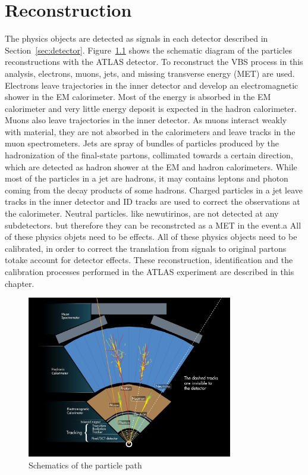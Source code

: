 \chapter{Reconstruction}
\label{chap:reconstruction}
The physics objects are detected as signals in each detector described in Section~\ref{sec:detector}.
Figure~\ref{fig:ParticlePath} shows the schematic diagram of the particles reconstructions with the ATLAS detector. 
To reconstruct the VBS process in this analysis, electrons, muons, jets, and missing transverse energy (MET) are used.
Electrons leave trajectories in the inner detector and develop an electromagnetic shower in the EM calorimeter. 
Most of the energy is absorbed in the EM calorimeter and very little energy deposit is expected in the hadron calorimeter.
Muons also leave trajectories in the inner detector.
As muons interact weakly with material, they are not absorbed in the calorimeters and leave tracks in the muon spectrometers.
Jets are spray of bundles of particles produced by the hadronization of the final-state partons, collimated towards a certain direction, which are detected as hadron shower at the EM and hadron calorimeters. While most of the particles in a jet are hadrons, it may contains leptons and photon coming from the decay products of some hadrons. Charged particles in a jet leave tracks in the inner detector and ID tracks are used to correct the observations at the calorimeter. Neutral particles. like newutirinos, are not detected at any subdetectors. but therefore they can be reconstrcted as a MET in the event.a All of these physics objets need to be effects. 
All of these physics objects need to be calibrated, in order to correct the translation from signals to original partons totake account for detector effects.
These reconstruction, identification and the calibration processes performed in the ATLAS experiment are described in this chapter.
\begin{figure}[tbp]
\begin{center}
 \includegraphics[width=0.80\textwidth,keepaspectratio]{figures/Reconstruction/ParticlePath}
\caption{
Schematics of the particle path
}
\label{fig:ParticlePath}
\end{center}
\end{figure}
